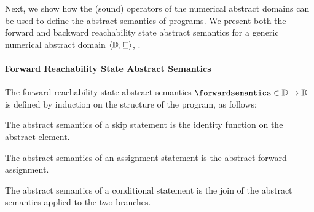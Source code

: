 Next, we show how the (sound) operators of the numerical abstract domains can be used to define the abstract semantics of programs. We present both the forward and backward reachability state abstract semantics for a generic numerical abstract domain $\langle \mathbb{D}, \sqsubseteq \rangle$, \cf{} .

\paragraph{Forward Reachability State Abstract Semantics}

The forward reachability state abstract semantics $\forwardsemantics\in\forwardtype$ is defined by induction on the structure of the program, as follows:

\begin{description}
  \item[\normalfont ($\pskipstmt$)] The abstract semantics of a skip statement is the identity function on the abstract element.
  \item[\normalfont ($\plassignstmt$)] The abstract semantics of an assignment statement is the abstract forward assignment.
  \item[\normalfont ($\pifstmt$)] The abstract semantics of a conditional statement is the join of the abstract semantics applied to the two branches.
\end{description}
